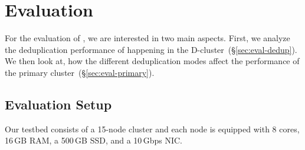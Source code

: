 \section{ Evaluation}
\label{sec:Evaluation}

For the evaluation of \sysname, we are interested in two main aspects. First, we analyze the deduplication
performance of \sysname happening in the D-cluster~(\S\ref{sec:eval-dedup}). 
We then look at, how
the different deduplication modes affect the performance of the primary cluster~(\S\ref{sec:eval-primary}).


\subsection{Evaluation Setup}

Our testbed consists of 
a 15-node cluster and
each node is equipped with 8 cores, 16\,GB RAM, a 500\,GB SSD, and a 10\,Gbps NIC. 


